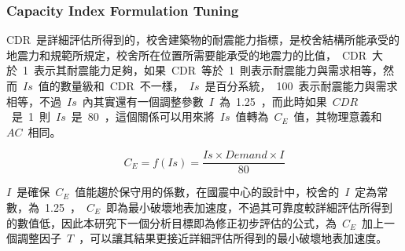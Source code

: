 \subsubsection{Capacity Index Formulation Tuning}

CDR~是詳細評估所得到的，校舍建築物的耐震能力指標，是校舍結構所能承受的地震力和規範所規定，校舍所在位置所需要能承受的地震力的比值，~CDR~大於~1~表示其耐震能力足夠，如果~CDR~等於~1~則表示耐震能力與需求相等，然而~$Is$~值的數量級和~CDR~不一樣，~$Is$~是百分系統，~100~表示耐震能力與需求相等，不過~$Is$~內其實還有一個調整參數~$I$~為~1.25~，而此時如果~$CDR$~是~1~則~$Is$~是~80~，這個關係可以用來將~$Is$~值轉為~$C_E$~值，其物理意義和~$AC$~相同。


\begin{equation} C_E = f(Is) = \dfrac{Is \times Demand \times I}{80}  \label{eq:CE}\end{equation}

$I$~是確保~$C_E$~值能趨於保守用的係數，在國震中心的設計中，校舍的~$I$~定為常數，為~1.25~，~$C_E$~即為最小破壞地表加速度，不過其可靠度較詳細評估所得到的數值低，因此本研究下一個分析目標即為修正初步評估的公式，為~$C_E$~加上一個調整因子~$T$~，可以讓其結果更接近詳細評估所得到的最小破壞地表加速度。



